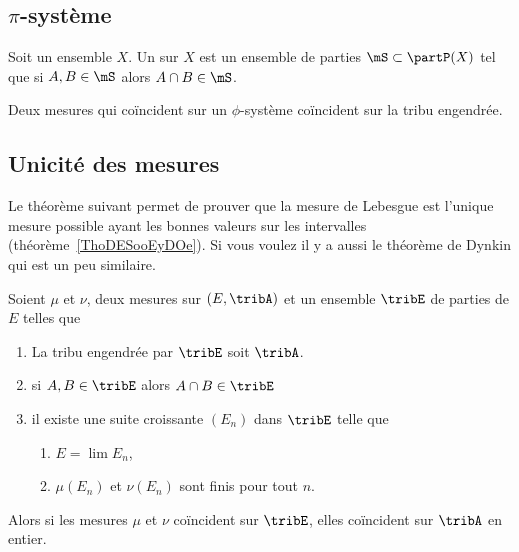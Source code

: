 \subsection{\( \pi\)-système}


\begin{definition}	\label{DEFooGYADooTudZmJ}
	Soit un ensemble \( X\). Un  sur \( X\) est un ensemble de parties \( \mS\subset\partP(X)\) tel que si \( A,B\in\mS\) alors \( A\cap B\in \mS\).
\end{definition}


\begin{proposition}	\label{PROPooWFCWooCCzZLT}
	Deux mesures qui coïncident sur un \( \phi\)-système coïncident sur la tribu engendrée.
\end{proposition}


\subsection{Unicité des mesures}


Le théorème suivant permet de prouver que la mesure de Lebesgue est l'unique mesure possible ayant les bonnes valeurs sur les intervalles (théorème~\ref{ThoDESooEyDOe}). Si vous voulez il y a aussi le théorème de Dynkin qui est un peu similaire\cite{BIBooEXABooKVzGao}.
\begin{theorem} \label{ThoJDYlsXu}
	Soient \( \mu\) et \( \nu\), deux mesures sur \( (E,\tribA)\) et un ensemble \( \tribE\) de parties de \( E\) telles que
	\begin{enumerate}
		\item
		      La tribu engendrée par \( \tribE\) soit \( \tribA\).
		\item
		      si \( A,B\in\tribE\) alors \( A\cap B\in\tribE\)
		\item
		      il existe une suite croissante \( (E_n)\) dans \( \tribE\) telle que
		      \begin{enumerate}
			      \item
			            \( E=\lim E_n\),
			      \item
			            \( \mu(E_n)\) et \( \nu(E_n)\) sont finis pour tout \( n\).
		      \end{enumerate}
	\end{enumerate}
	Alors si les mesures \( \mu\) et \( \nu\) coïncident sur \( \tribE\), elles coïncident sur \( \tribA\) en entier.
\end{theorem}

